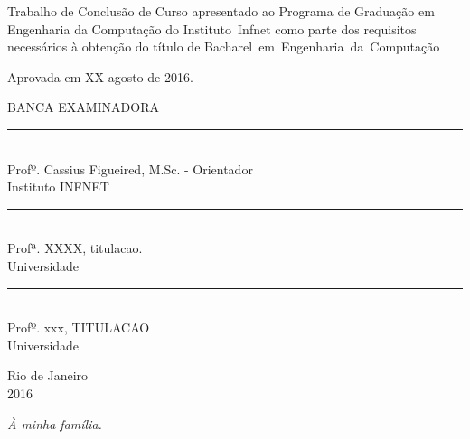 \noindent
\begin{flushright}
\begin{minipage}[t]{8cm} 

Trabalho de Conclusão de Curso apresentado ao Programa de Graduação em Engenharia da Computação do \mbox{Instituto Infnet} como parte dos requisitos
necessários à obtenção do título de \mbox{Bacharel em Engenharia da Computação}

\end{minipage}
\end{flushright}
\vspace{ 5mm}  %
\noindent
Aprovada em XX agosto de 2016. \\
\begin{flushright}
  \parbox{15cm}
  {
  \begin{center}
  BANCA EXAMINADORA \\
  \vspace{5mm}
  \rule{11cm}{.1mm} \\
	Profº. Cassius Figueired, M.Sc. - Orientador \\ 
	Instituto INFNET \\
  \vspace{5mm}
  \rule{11cm}{.1mm} \\
    Profª. XXXX, titulacao.  \\
    Universidade \\
  \vspace{5mm}
  \rule{11cm}{.1mm} \\
    Profº. xxx, TITULACAO \\
    Universidade\\
  \end{center}
  }
\end{flushright}
\begin{center}
  \vspace{4mm} %
 Rio de Janeiro \\
  2016
\end{center}

\cleardoublepage
\thispagestyle{empty}
\vspace*{200mm}

\begin{flushright}
{\em 
À minha família.
}
\end{flushright}
\newpage


